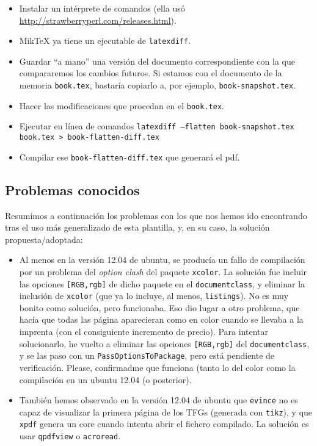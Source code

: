 \begin{itemize}
\item Instalar un intérprete de comandos (ella usó
  \url{http://strawberryperl.com/releases.html}).
  
\item MikTeX ya tiene un ejecutable de \texttt{latexdiff}.
  
\item Guardar ``a mano'' una versión del documento correspondiente con la
  que compararemos los cambios futuros. Si estamos con el documento de la
  memoria \texttt{book.tex}, bastaría copiarlo a, por ejemplo,
  \texttt{book-snapshot.tex}.
  
\item Hacer las modificaciones que procedan en el  \texttt{book.tex}.
  
\item Ejecutar en línea de comandos \texttt{latexdiff --flatten
    book-snapshot.tex book.tex > book-flatten-diff.tex}
  
\item Compilar ese \texttt{book-flatten-diff.tex} que generará el pdf.
  
\end{itemize}

\subsection{Problemas conocidos}
\label{sec:problemas-conocidos}

Resumimos a continuación los problemas con los que nos hemos ido
encontrando tras el uso más generalizado de esta plantilla, y, en su
caso, la solución propuesta/adoptada:

\begin{itemize}

\item Al menos en la versión 12.04 de ubuntu, se producía un fallo de
  compilación por un problema del \textit{option clash} del paquete
  \texttt{xcolor}. La solución fue incluir las opciones
  \texttt{[RGB,rgb]} de dicho paquete en el \texttt{documentclass}, y
  eliminar la inclusión de \texttt{xcolor} (que ya lo incluye, al menos,
  \texttt{listings}). No es muy bonito como solución, pero
  funcionaba. Eso dio lugar a otro problema, que hacía que todas las
  página aparecieran como en color cuando se llevaba a la imprenta (con
  el consiguiente incremento de precio). Para intentar solucionarlo, he
  vuelto a eliminar las opciones \texttt{[RGB,rgb]} del
  \texttt{documentclass}, y se las paso con un
  \texttt{PassOptionsToPackage}, pero está pendiente de
  verificación. Please, confirmadme que funciona (tanto lo del color
  como la compilación en un ubuntu 12.04 (o posterior).

\item También hemos observado en la versión 12.04 de ubuntu que
  \texttt{evince} no es capaz de visualizar la primera página de los
  TFGs (generada con \texttt{tikz}), y que \texttt{xpdf} genera un core
  cuando intenta abrir el fichero compilado. La solución es usar
  \texttt{qpdfview} o \texttt{acroread}. 

\end{itemize}

